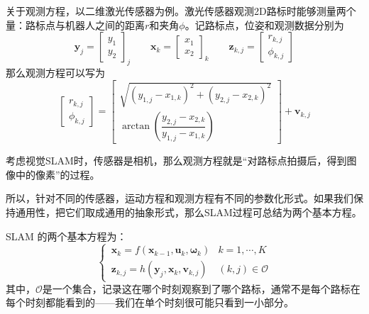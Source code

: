 关于观测方程，以二维激光传感器为例。激光传感器观测2D路标时能够测量两个量：路标点与机器人之间的距离$r$和夹角$\phi$。记路标点，位姿和观测数据分别为
\begin{equation}
    \bm{y}_j = 
    \begin{bmatrix}
        y_1 \\
        y_2
    \end{bmatrix}_j
    \qquad
    \bm{x}_k =
    \begin{bmatrix}
        x_1 \\
        x_2
    \end{bmatrix}_k
    \qquad
    \bm{z}_{k,j} =
    \begin{bmatrix}
        r_{k,j} \\
        \phi_{k,j}
    \end{bmatrix}
\end{equation}
那么观测方程可以写为
\begin{equation}
    \begin{bmatrix}
        r_{k,j} \\
        \phi_{k,j}
    \end{bmatrix}
    =
    \begin{bmatrix}
        \sqrt{(y_{1,j} - x_{1,k})^2 + (y_{2,j} - x_{2,k})^2}\\
        \arctan \left(\dfrac{y_{2,j} - x_{2,k}}{y_{1,j} - x_{1,k}}\right)
    \end{bmatrix}
    + \bm{v}_{k,j}
\end{equation}

考虑视觉SLAM时，传感器是相机，那么观测方程就是“对路标点拍摄后，得到图像中的像素”的过程。

所以，针对不同的传感器，运动方程和观测方程有不同的参数化形式。如果我们保持通用性，把它们取成通用的抽象形式，那么SLAM过程可总结为两个基本方程。

{
    SLAM 的两个基本方程为：
    \begin{equation}
        \begin{cases}
            \, \bm{x}_k = f(\bm{x}_{k-1}, \bm{u}_k, \bm{\omega}_k) & k = 1,\cdots, K \\
            \, \bm{z}_{k,j} = h(\bm{y}_j, \bm{x}_k, \bm{v}_{k,j}) & (k,j) \in \mathcal{O}
        \end{cases}
    \end{equation}
    其中，$\mathcal{O}$是一个集合，记录这在哪个时刻观察到了哪个路标，通常不是每个路标在每个时刻都能看到的——我们在单个时刻很可能只看到一小部分。
}

